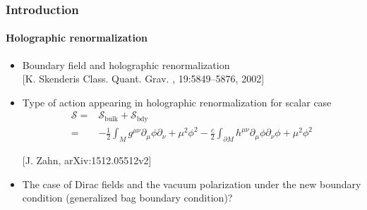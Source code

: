 \documentclass[french]{beamer}
\begin{document}
\begin{frame}
\frametitle{Introduction}
\framesubtitle{Holographic renormalization}

\begin{itemize}

\item Boundary field and holographic renormalization
\\
\color{blue}[K. Skenderis
Class. Quant. Grav.
,
19:5849–5876, 2002]\color{black}

\item Type of action appearing in holographic renormalization for scalar case
\begin{equation*}
\begin{split}
\mathcal{S} = & \mathcal{S}_{\mathrm{bulk}} + \mathcal{S}_{\mathrm{bdy}}
\\ = &
-\frac 1 2 \int_M g^{\mu\nu} \partial_\mu \phi \partial_{\nu} + 
\mu^2\phi^2 - \frac c 2 \int_{\partial M}h^{\mu\nu}\partial_\mu\phi\partial_\nu\phi + \mu^2\phi^2
\end{split}
\end{equation*}

\color{blue}[J. Zahn,  arXiv:1512.05512v2]\color{black}

\item The case of Dirac fields and the vacuum polarization under the new boundary condition (generalized bag boundary condition)?

\end{itemize}

\end{frame}
\end{document}

